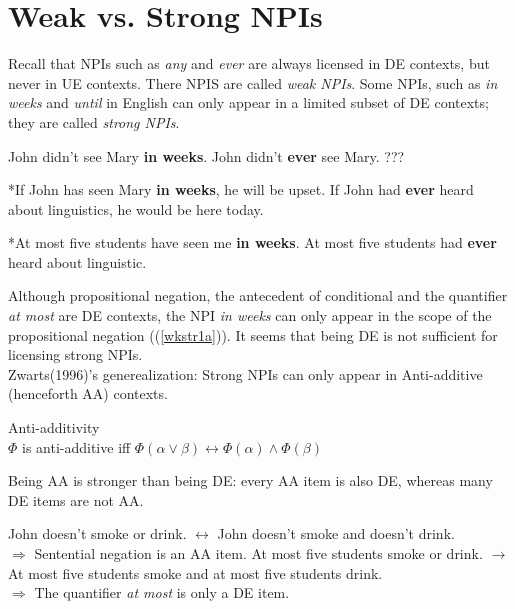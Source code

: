 \documentclass[a4paper,11pt]{article}
\newcommand{\reff}[1]{(\ref{#1})}
\begin{document}
\section{Weak vs. Strong NPIs}

Recall that NPIs such as \textit{any} and \textit{ever} are always licensed in DE contexts, but never in UE contexts. There NPIS are called \textit{weak NPIs}. Some NPIs, such as \textit{in weeks} and \textit{until} in English can only appear in a limited subset of DE contexts; they are called \textit{strong NPIs}.
\begin{exe}
\ex\label{wkstr} \begin{xlist}
\ex\label{wkstr1} \begin{xlist}
\ex\label{wkstr1a} John didn't see Mary \textbf{in weeks}. 
\ex\label{wkstr1b} John didn't \textbf{ever} see Mary. ???
\end{xlist}
\ex\label{wkstr2} \begin{xlist}
\ex\label{wkstr2a} *If John has seen Mary \textbf{in weeks}, he will be upset.
\ex\label{wkstr2b} If John had \textbf{ever} heard about linguistics, he would be here today.
\end{xlist}
\ex\label{wkstr3} \begin{xlist}
\ex\label{wkstr3a} *At most five students have seen me \textbf{in weeks}.
\ex\label{wkstr3b} At most five students had \textbf{ever} heard about linguistic.
\end{xlist}
\end{xlist}
\end{exe}
Although propositional negation, the antecedent of conditional and the quantifier \textit{at most} are DE contexts, the NPI \textit{in weeks} can only appear in the scope of the propositional negation (\reff{wkstr1a}). It seems that being DE is not sufficient for licensing strong NPIs.
\\Zwarts(1996)'s generealization: Strong NPIs can only appear in Anti-additive (henceforth AA) contexts. 
\begin{exe}
\ex\label{aa} Anti-additivity \\$\Phi$ is anti-additive iff $\Phi(\alpha\vee\beta) \leftrightarrow \Phi(\alpha)\wedge \Phi(\beta)$
\end{exe}
Being AA is stronger than being DE: every AA item is also DE, whereas many DE items are not AA.
\begin{exe}
\ex\label{aa1} \begin{xlist}
\ex\label{aaneg} John doesn't smoke or drink. $\leftrightarrow$ John doesn't smoke and doesn't drink.
\\$\Rightarrow$ Sentential negation is an AA item.
\ex\label{aaatmost} At most five students smoke or drink. $\rightarrow$ At most five students smoke and at most five students drink.
\\$\Rightarrow$ The quantifier \textit{at most} is only a DE item.
\end{xlist}
\end{exe}
\end{document}
